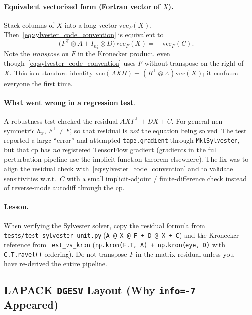\documentclass[11pt,a4paper]{article}
\theoremstyle{definition}
\newcommand{\code}[1]{\texttt{\color{codecolor}#1}}
\begin{document}
	\paragraph{Equivalent vectorized form (Fortran vector of $X$).}
	Stack columns of $X$ into a long vector $\mathrm{vec}_F(X)$.
	Then~\eqref{eq:sylvester_code_convention} is equivalent to
	\begin{equation}\label{eq:sylvester_kron_form}
		\bigl( F^\top \otimes A + I_{n_x^2} \otimes D \bigr)\, \mathrm{vec}_F(X) = -\,\mathrm{vec}_F(C).
	\end{equation}
	Note the \emph{transpose} on $F$ in the Kronecker product, even though~\eqref{eq:sylvester_code_convention} uses $F$ without transpose on the right of $X$.
	This is a standard identity $\mathrm{vec}(A X B) = (B^\top \otimes A)\mathrm{vec}(X)$; it confuses everyone the first time.
	
	\paragraph{What went wrong in a regression test.}
	A robustness test checked the residual $A X F^\top + D X + C$.
	For general non-symmetric $h_x$, $F^\top \neq F$, so that residual is \emph{not} the equation being solved.
	The test reported a large ``error'' and attempted \code{tape.gradient} through \code{MklSylvester}, but that op has \emph{no} registered TensorFlow gradient (gradients in the full perturbation pipeline use the implicit function theorem elsewhere).
	The fix was to align the residual check with~\eqref{eq:sylvester_code_convention} and to validate sensitivities w.r.t.\ $C$ with a small implicit-adjoint / finite-difference check instead of reverse-mode autodiff through the op.
	
	\paragraph{Lesson.}
	When verifying the Sylvester solver, copy the residual formula from \code{tests/test\_sylvester\_unit.py} (\code{A @ X @ F + D @ X + C}) and the Kronecker reference from \code{test\_vs\_kron} (\code{np.kron(F.T, A) + np.kron(eye, D)} with \code{C.T.ravel()} ordering).
	Do not transpose $F$ in the matrix residual unless you have re-derived the entire pipeline.
	
	\subsection{LAPACK \code{DGESV} Layout (Why \code{info=-7} Appeared)}
	
\end{document}
